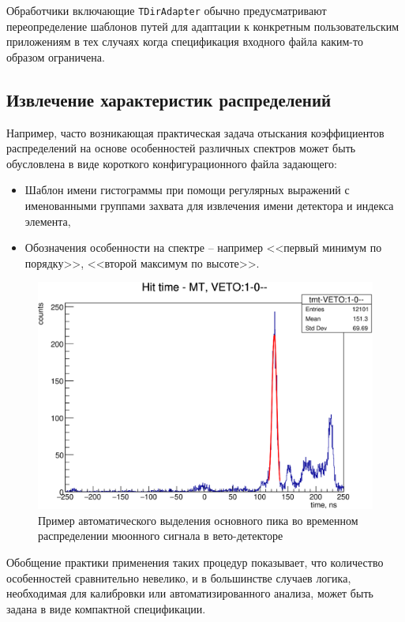 Обработчики включающие \texttt{TDirAdapter} обычно
предусматривают переопределение шаблонов путей для адаптации к
конкретным пользовательским приложениям в тех случаях когда
спецификация входного файла каким-то образом ограничена.

\subsection{Извлечение характеристик распределений}

Например, часто возникающая практическая задача отыскания
коэффициентов распределений на основе особенностей различных
спектров может быть обусловлена в виде короткого конфигурационного
файла задающего:
\begin{itemize}
    \item Шаблон имени гистограммы при помощи регулярных
    выражений с именованными группами захвата для извлечения
    имени детектора и индекса элемента,
    \item Обозначения особенности на
    спектре -- например <<первый минимум по порядку>>,
    <<второй максимум по высоте>>.
\end{itemize}

\begin{figure}
    \centering
    \includegraphics[width=0.5\linewidth]{images//illustrative/tmt-fit-example.png}
    \caption{Пример автоматического выделения основного пика во временном
    распределении мюонного сигнала в вето-детекторе}
    \label{fig:placeholder}
\end{figure}

Обобщение практики применения таких процедур показывает, что количество
особенностей сравнительно невелико, и в большинстве случаев логика,
необходимая для калибровки или автоматизированного анализа, может быть
задана в виде компактной спецификации.
